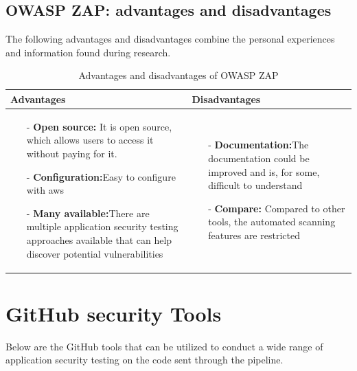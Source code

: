 \subsection{OWASP ZAP: advantages and disadvantages}
The following advantages and disadvantages combine the personal experiences and information found during research.\cite{prosconsZAP}
\begin{table}[H]
    \begin{threeparttable}
        \begin{tabular}{|>{\raggedright\arraybackslash}p{6cm}|>{\raggedright\arraybackslash}p{6cm}|}
            \hline
            \textbf{Advantages} & \textbf{Disadvantages} \\
            \hline
            \begin{itemize}
                \item [-]\textbf{Open source:} It is open source, which allows users to access it without paying for it. 
                \vspace{5pt}
                \item [-]\textbf{Configuration:}Easy to configure with \acrshort{aws}
                \vspace{5pt}
                \item [-]\textbf{Many available:}There are multiple application security testing approaches available that can help discover potential vulnerabilities
            \end{itemize}
            &
            \begin{itemize}
                \item [-] \textbf{Documentation:}The documentation could be improved and is, for some, difficult to understand
                \vspace{5pt}
                \item [-]\textbf{Compare:} Compared to other tools, the automated scanning features are restricted
            \end{itemize}
            \\
            \hline
        \end{tabular}
            \caption{Advantages and disadvantages of OWASP ZAP}
    \end{threeparttable}
\end{table}


\section{GitHub security Tools}
Below are the GitHub tools that can be utilized to conduct a wide range of application security testing on the code sent through the pipeline. 

